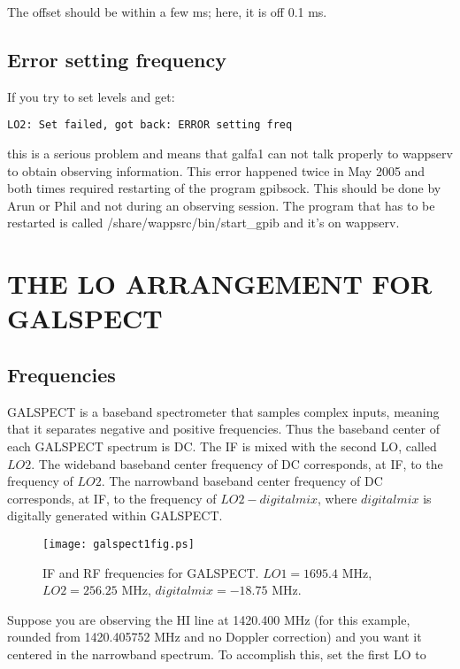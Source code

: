 \documentclass[psfig,preprint]{aastex}
\begin{document}
The offset should be within a few ms; here, it is off 0.1 ms.

\subsection{Error setting frequency}

If you try to set levels and get:

\begin{verbatim}
LO2: Set failed, got back: ERROR setting freq
\end{verbatim}
this is a  serious problem and means that galfa1 can not talk properly to
wappserv to obtain observing information.
This error happened twice in May 2005 and both times required
restarting of the program gpibsock.
This should be done by Arun or Phil and not during an observing session.
The program that has to be restarted is called 
/share/wappsrc/bin/start\_gpib and it's on wappserv.


\section{ THE LO ARRANGEMENT FOR GALSPECT} \label{lo}

\subsection{ Frequencies}

	GALSPECT is a baseband spectrometer that samples complex inputs,
meaning that it separates negative and positive frequencies. Thus the
baseband center of each GALSPECT spectrum is DC. The IF is mixed with
the second LO, called $LO2$. The wideband baseband center frequency of
DC corresponds, at IF, to the frequency of $LO2$. The narrowband baseband
center frequency of DC corresponds, at IF, to the frequency of $LO2 -
digitalmix$, where $digitalmix$ is digitally generated within GALSPECT. 

\begin{figure}[!h]
\begin{center}
\texttt{[image: galspect1fig.ps]}
\end{center}

\caption{IF and RF frequencies for GALSPECT. $LO1 = 1695.4$ MHz,
$LO2=256.25$ MHz, $digitalmix=-18.75$ MHz.}
\end{figure}

	Suppose you are observing the HI line at 1420.400 MHz (for this
example, rounded from 1420.405752 MHz and no Doppler correction) and you
want it centered in the narrowband spectrum. To accomplish this, set the
first LO to
\end{document}
